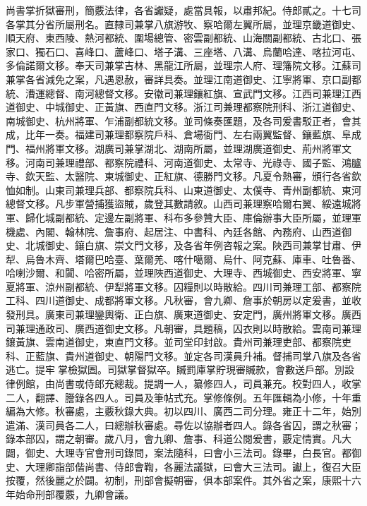\begin{pinyinscope}
尚書掌折獄審刑，簡覈法律，各省讞疑，處當具報，以肅邦紀。侍郎貳之。十七司各掌其分省所屬刑名。直隸司兼掌八旗游牧、察哈爾左翼所屬，並理京畿道御史、順天府、東西陵、熱河都統、圍場總管、密雲副都統、山海關副都統、古北口、張家口、獨石口、喜峰口、蘆峰口、塔子溝、三座塔、八溝、烏蘭哈達、喀拉河屯、多倫諾爾文移。奉天司兼掌吉林、黑龍江所屬，並理宗人府、理籓院文移。江蘇司兼掌各省減免之案，凡遇恩赦，審詳具奏。並理江南道御史、江寧將軍、京口副都統、漕運總督、南河總督文移。安徽司兼理鑲紅旗、宣武門文移。江西司兼理江西道御史、中城御史、正黃旗、西直門文移。浙江司兼理都察院刑科、浙江道御史、南城御史、杭州將軍、乍浦副都統文移。並司條奏匯題，及各司爰書駁正者，會其成，比年一奏。福建司兼理都察院戶科、倉場衙門、左右兩翼監督、鑲藍旗、阜成門、福州將軍文移。湖廣司兼掌湖北、湖南所屬，並理湖廣道御史、荊州將軍文移。河南司兼理禮部、都察院禮科、河南道御史、太常寺、光祿寺、國子監、鴻臚寺、欽天監、太醫院、東城御史、正紅旗、德勝門文移。凡夏令熱審，頒行各省欽恤如制。山東司兼理兵部、都察院兵科、山東道御史、太僕寺、青州副都統、東河總督文移。凡步軍營捕獲盜賊，歲登其數請敘。山西司兼理察哈爾右翼、綏遠城將軍、歸化城副都統、定邊左副將軍、科布多參贊大臣、庫倫辦事大臣所屬，並理軍機處、內閣、翰林院、詹事府、起居注、中書科、內廷各館、內務府、山西道御史、北城御史、鑲白旗、崇文門文移，及各省年例咨報之案。陜西司兼掌甘肅、伊犁、烏魯木齊、塔爾巴哈臺、葉爾羌、喀什噶爾、烏什、阿克蘇、庫車、吐魯番、哈喇沙爾、和闐、哈密所屬，並理陜西道御史、大理寺、西城御史、西安將軍、寧夏將軍、涼州副都統、伊犁將軍文移。囚糧則以時散給。四川司兼理工部、都察院工科、四川道御史、成都將軍文移。凡秋審，會九卿、詹事於朝房以定爰書，並收發刑具。廣東司兼理鑾輿衛、正白旗、廣東道御史、安定門，廣州將軍文移。廣西司兼理通政司、廣西道御史文移。凡朝審，具題稿，囚衣則以時散給。雲南司兼理鑲黃旗、雲南道御史，東直門文移。並司堂印封啟。貴州司兼理吏部、都察院吏科、正藍旗、貴州道御史、朝陽門文移。並定各司漢員升補。督捕司掌八旗及各省逃亡。提牢掌檢獄圄。司獄掌督獄卒。贓罰庫掌貯現審贓款，會數送戶部。別設律例館，由尚書或侍郎充總裁。提調一人，纂修四人，司員兼充。校對四人，收掌二人，翻譯、謄錄各四人。司員及筆帖式充。掌修條例。五年匯輯為小修，十年重編為大修。秋審處，主覈秋錄大典。初以四川、廣西二司分理。雍正十二年，始別遣滿、漢司員各二人，曰總辦秋審處。尋佐以協辦者四人。錄各省囚，謂之秋審；錄本部囚，謂之朝審。歲八月，會九卿、詹事、科道公閱爰書，覈定情實。凡大闢，御史、大理寺官會刑司錄問，案法隨科，曰會小三法司。錄畢，白長官。都御史、大理卿詣部偕尚書、侍郎會鞫，各麗法議獄，曰會大三法司。讞上，復召大臣按覆，然後麗之於闢。初制，刑部會擬朝審，俱本部案件。其外省之案，康熙十六年始命刑部覆覈，九卿會議。


\end{pinyinscope}
